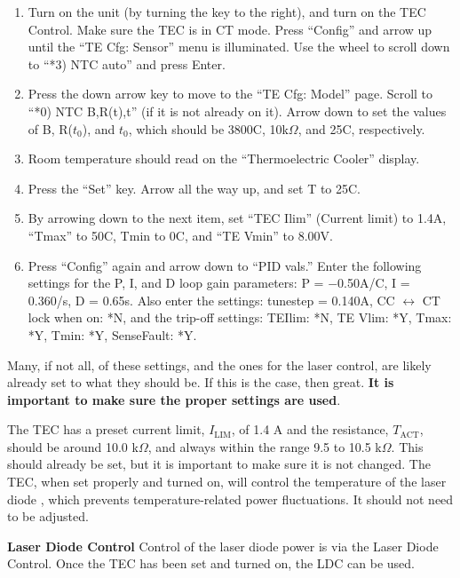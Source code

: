 \documentclass{../lab}
\begin{document}
\begin{enumerate}
    \item Turn on the unit (by turning the key to the right), and turn on the TEC Control. Make sure the TEC is in CT mode. Press ``Config'' and arrow up until the ``TE Cfg: Sensor'' menu is illuminated. Use the wheel to scroll down to ``*3) NTC auto'' and press Enter.

    \item Press the down arrow key to move to the ``TE Cfg: Model'' page. Scroll to ``*0) NTC B,R(t),t'' (if it is not already on it). Arrow down to set the values of Β, R($t_0$), and $t_0$, which should be 3800C, 10k$\Omega$, and 25C, respectively.

    \item Room temperature should read on the ``Thermoelectric Cooler'' display.

    \item Press the ``Set'' key. Arrow all the way up, and set T to 25C.

    \item By arrowing down to the next item, set ``TEC Ilim'' (Current limit) to 1.4A, ``Tmax'' to 50C, Tmin to 0C, and ``TE Vmin'' to 8.00V.

    \item Press ``Config'' again and arrow down to ``PID vals.'' Enter the following settings for the P, I, and D loop gain parameters: P = $-$0.50A/C, I = 0.360/s, D = 0.65s. Also enter the settings: tunestep = 0.140A, CC $\leftrightarrow$ CT lock when on: *N, and the trip-off settings: TEIlim: *N, TE Vlim: *Y, Tmax: *Y, Tmin: *Y, SenseFault: *Y.
\end{enumerate}

Many, if not all, of these settings, and the ones for the laser control, are likely already set to what they should be. If this is the case, then great. \textbf{It is important to make sure the proper settings are used}.

\newpage

The TEC has a preset current limit, $I_\text{LIM}$, of 1.4 A and the resistance, $T_\text{ACT}$, should be around 10.0 k$\Omega$, and always within the range 9.5 to 10.5 k$\Omega$. This should already be set, but it is important to make sure it is not changed. The TEC, when set properly and turned on, will control the temperature of the laser diode , which prevents temperature-related power fluctuations. It should not need to be adjusted.

\textbf{Laser Diode Control} Control of the laser diode power is via the Laser Diode Control. Once the TEC has been set and turned on, the LDC can be used.
\end{document}
